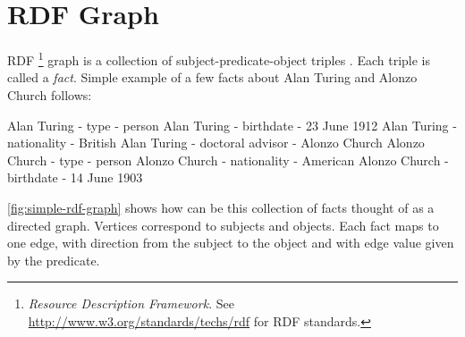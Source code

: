 \documentclass[12pt, twoside]{fithesis2}
\renewcommand{\_}{\leavevmode \kern0.07em\vbox{\hrule width0.4em}}
\begin{document}
\section{RDF Graph}
\label{sec:rdf-graph}


RDF%
\footnote{\textit{Resource Description Framework}.
See \url{http://www.w3.org/standards/techs/rdf} for RDF standards.}
graph is a collection of subject-predicate-object triples \parencite[][63]{semantic-web}.
Each triple is called a \textit{fact}.
Simple example of a few facts about Alan Turing and Alonzo Church follows:
\begin{code}
Alan Turing - type - person
Alan Turing - birthdate - 23 June 1912
Alan Turing - nationality - British
Alan Turing - doctoral advisor - Alonzo Church
Alonzo Church - type - person
Alonzo Church - nationality - American
Alonzo Church - birthdate - 14 June 1903
\end{code}
\noindent
\autoref{fig:simple-rdf-graph} shows how can be this collection of facts thought of as a directed graph.
Vertices correspond to subjects and objects. Each fact maps to one edge, with direction from the subject to the object and with edge value given by the predicate.
\end{document}
